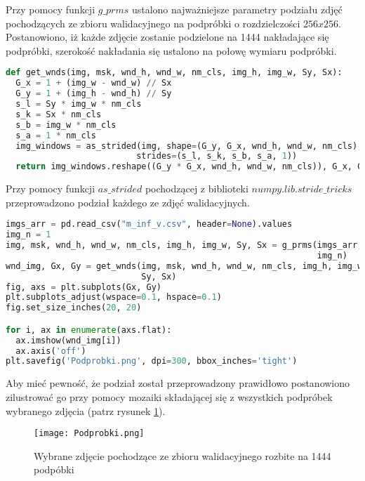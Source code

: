 \cell
Przy pomocy funkcji $\textit{g$\_$prms}$ ustalono najważniejsze parametry podziału zdjęć pochodzących ze zbioru walidacyjnego na podpróbki o rozdzielczości $\textit{256x256}$. Postanowiono, iż każde zdjęcie zostanie podzielone na 1444 nakładające się podpróbki, szerokość nakładania się ustalono na połowę wymiaru podpróbki.

\cell
\begin{lstlisting}[name=Rozdzial3.1, language=Python]
def get_wnds(img, msk, wnd_h, wnd_w, nm_cls, img_h, img_w, Sy, Sx):
  G_x = 1 + (img_w - wnd_w) // Sx
  G_y = 1 + (img_h - wnd_h) // Sy
  s_l = Sy * img_w * nm_cls
  s_k = Sx * nm_cls
  s_b = img_w * nm_cls
  s_a = 1 * nm_cls
  img_windows = as_strided(img, shape=(G_y, G_x, wnd_h, wnd_w, nm_cls), 
                          strides=(s_l, s_k, s_b, s_a, 1))
  return img_windows.reshape((G_y * G_x, wnd_h, wnd_w, nm_cls)), G_x, G_y
\end{lstlisting}


\cell
Przy pomocy funkcji $\textit{as$\_$strided}$ pochodzącej z biblioteki $\textit{numpy.lib.stride$\_$tricks}$ przeprowadzono podział każdego ze zdjęć walidacyjnych.

\cell
\begin{lstlisting}[name=Rozdzial3.1, language=Python]
imgs_arr = pd.read_csv("m_inf_v.csv", header=None).values
img_n = 1
img, msk, wnd_h, wnd_w, nm_cls, img_h, img_w, Sy, Sx = g_prms(imgs_arr, 
                                                              img_n)
wnd_img, Gx, Gy = get_wnds(img, msk, wnd_h, wnd_w, nm_cls, img_h, img_w, 
                           Sy, Sx)
fig, axs = plt.subplots(Gx, Gy)
plt.subplots_adjust(wspace=0.1, hspace=0.1)
fig.set_size_inches(20, 20)

for i, ax in enumerate(axs.flat):  
  ax.imshow(wnd_img[i])
  ax.axis('off')
plt.savefig('Podprobki.png', dpi=300, bbox_inches='tight')
\end{lstlisting}

Aby mieć pewność, że podział został przeprowadzony prawidłowo postanowiono zilustrować go przy pomocy mozaiki składającej się z wszystkich podpróbek wybranego zdjęcia (patrz rysunek \ref{fig:podprob1}).

\begin{figure}[!h]
    \centering \texttt{[image: Podprobki.png]}
    \captionsetup{format=hang}
    \caption{Wybrane zdjęcie pochodzące ze zbioru walidacyjnego rozbite na 1444 podpóbki}
    \label{fig:podprob1}
\end{figure}

